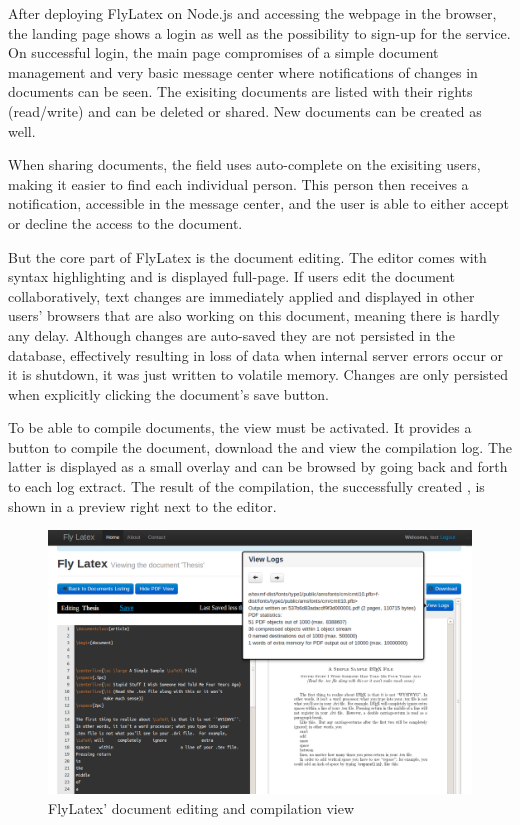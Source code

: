 After deploying FlyLatex on Node.js and accessing the webpage in the browser, the landing page shows a login as well as the possibility to sign-up for the service. On successful login, the main page compromises of a simple document management and very basic message center where notifications of changes in documents can be seen. The exisiting documents are listed with their rights (read/write) and can be deleted or shared. New documents can be created as well. 

When sharing documents, the field uses auto-complete on the exisiting users, making it easier to find each individual person. This person then receives a notification, accessible in the message center, and the user is able to either accept or decline the access to the document.

But the core part of FlyLatex is the document editing. The editor comes with syntax highlighting and is displayed full-page. If users edit the document collaboratively, text changes are immediately applied and displayed in other users' browsers that are also working on this document, meaning there is hardly any delay. Although changes are auto-saved they are not persisted in the database, effectively resulting in loss of data when internal server errors occur or it is shutdown, it was just written to volatile memory. Changes are only persisted when explicitly clicking the document's save button.

\pagebreak

To be able to compile documents, the  view must be activated. It provides a button to compile the document, download the  and view the compilation log. The latter is displayed as a small overlay and can be browsed by going back and forth to each log extract. The result of the compilation, the successfully created , is shown in a preview right next to the editor.

\begin{figure}[H]
	\centering
		\includegraphics[width=\textwidth]{images/flylatex.png}
	\caption{FlyLatex' document editing and compilation view}
\end{figure}

